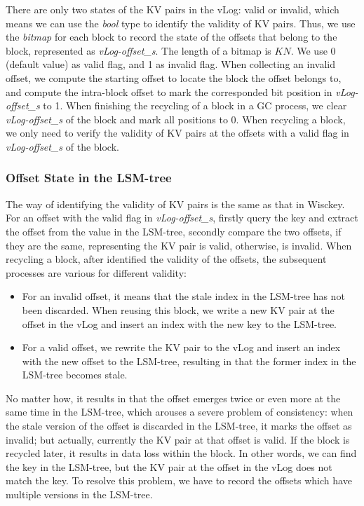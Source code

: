 \documentclass[sigconf]{acmart}
\begin{document}
There are only two states of the KV pairs in the vLog: valid or invalid, which means we can use the \textit{bool} type to identify the validity of KV pairs. Thus, we use the \textit{bitmap} for each block to record the state of the offsets that belong to the block, represented as \textit{vLog-offset\_s}. The length of a bitmap is $KN$. We use 0 (default value) as valid flag, and 1 as invalid flag. When collecting an invalid offset, we compute the starting offset to locate the block the offset belongs to, and compute the intra-block offset to mark the corresponded bit position in \textit{vLog-offset\_s} to 1. When finishing the recycling of a block in a GC process, we clear \textit{vLog-offset\_s} of the block and mark all positions to 0. When recycling a block, we only need to verify the validity of KV pairs at the offsets with a valid flag in \textit{vLog-offset\_s} of the block.

\subsubsection{Offset State in the LSM-tree}
The way of identifying the validity of KV pairs is the same as that in Wisckey. For an offset with the valid flag in \textit{vLog-offset\_s}, firstly query the key and extract the offset from the value in the LSM-tree, secondly compare the two offsets, if they are the same, representing the KV pair is valid, otherwise, is invalid. When recycling a block, after identified the validity of the offsets, the subsequent processes are various for different validity:
\begin{itemize}
	\item For an invalid offset, it means that the stale index in the LSM-tree has not been discarded. When reusing this block, we write a new KV pair at the offset in the vLog and insert an index with the new key to the LSM-tree. 
	\item For a valid offset, we rewrite the KV pair to the vLog and insert an index with the new offset to the LSM-tree, resulting in that the former index in the LSM-tree becomes stale. 
\end{itemize}

No matter how, it results in that the offset emerges twice or even more at the same time in the LSM-tree, which arouses a severe problem of consistency: when the stale version of the offset is discarded in the LSM-tree, it marks the offset as invalid; but actually, currently the KV pair at that offset is valid. If the block is recycled later, it results in data loss within the block. In other words, we can find the key in the LSM-tree, but the KV pair at the offset in the vLog does not match the key. To resolve this problem, we have to record the offsets which have multiple versions in the LSM-tree.
\end{document}
